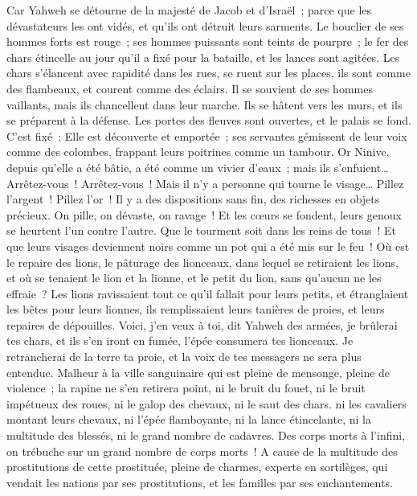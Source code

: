 \begin{multicols}{2}
Car Yahweh se détourne de la majesté de Jacob et d'Israël~; parce que les dévastateurs les ont vidés, et qu'ils ont détruit leurs sarments.
Le bouclier de ses hommes forts est rouge~; ses hommes puissants sont teints de pourpre~; le fer des chars étincelle au jour qu'il a fixé pour la bataille, et les lances sont agitées.
Les chars s'élancent avec rapidité dans les rues, se ruent sur les places, ils sont comme des flambeaux, et courent comme des éclairs.
Il se souvient de ses hommes vaillants, mais ils chancellent dans leur marche. Ils se hâtent vers les murs, et ils se préparent à la défense.
Les portes des fleuves sont ouvertes, et le palais se fond.
C'est fixé~: Elle est découverte et emportée~; ses servantes gémissent de leur voix comme des colombes, frappant leurs poitrines comme un tambour.
Or Ninive, depuis qu'elle a été bâtie, a été comme un vivier d'eaux~; mais ils s'enfuient… Arrêtez-vous~! Arrêtez-vous~! Mais il n'y a personne qui tourne le visage…
Pillez l'argent~! Pillez l'or~! Il y a des dispositions sans fin, des richesses en objets précieux.
On pille, on dévaste, on ravage~! Et les cœurs se fondent, leurs genoux se heurtent l'un contre l'autre. Que le tourment soit dans les reins de tous~! Et que leurs visages deviennent noirs comme un pot qui a été mis sur le feu~!
Où est le repaire des lions, le pâturage des lionceaux, dans lequel se retiraient les lions, et où se tenaient le lion et la lionne, et le petit du lion, sans qu'aucun ne les effraie~?
Les lions ravissaient tout ce qu'il fallait pour leurs petits, et étranglaient les bêtes pour leurs lionnes, ils remplissaient leurs tanières de proies, et leurs repaires de dépouilles.
Voici, j'en veux à toi, dit Yahweh des armées, je brûlerai tes chars, et ils s'en iront en fumée, l'épée consumera tes lionceaux. Je retrancherai de la terre ta proie, et la voix de tes messagers ne sera plus entendue.
\VerseOne{}Malheur à la ville sanguinaire qui est pleine de mensonge, pleine de violence~; la rapine ne s'en retirera point,
ni le bruit du fouet, ni le bruit impétueux des roues, ni le galop des chevaux, ni le saut des chars.
ni les cavaliers montant leurs chevaux, ni l'épée flamboyante, ni la lance étincelante, ni la multitude des blessés, ni le grand nombre de cadavres. Des corps morts à l'infini, on trébuche sur un grand nombre de corps morts~!
A cause de la multitude des prostitutions de cette prostituée, pleine de charmes, experte en sortilèges, qui vendait les nations par ses prostitutions, et les familles par ses enchantements.

\end{multicols}
